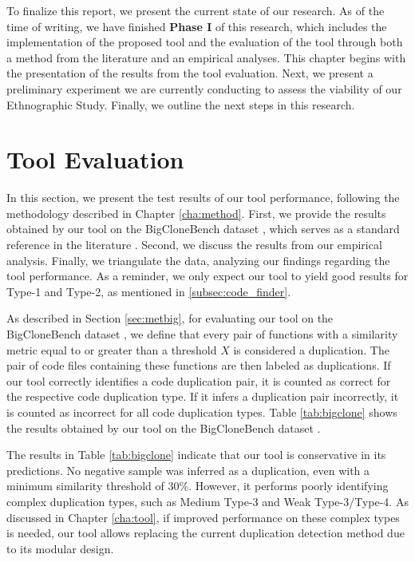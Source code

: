 \en 

To finalize this report, we present the current state of our research. As of the 
time of writing, we have finished \textbf{Phase I} of this research, 
which includes the implementation of 
the proposed tool and the evaluation of the tool through both a method from the 
literature and an empirical analyses. This chapter begins with the presentation of 
the results from the tool evaluation. Next, we present a preliminary experiment 
we are currently conducting to assess the viability of our Ethnographic Study. 
Finally, we outline the next steps in this research.

\section{Tool Evaluation}
\label{sec:eval}

In this section, we present the test results of our tool performance, following the 
methodology described in Chapter \ref{cha:method}. First, we provide the results 
obtained by our tool on the BigCloneBench dataset \citep{bigclonebench}, which 
serves as a standard reference in the literature \citep{litreview}. Second, we 
discuss the results from our empirical analysis. Finally, we triangulate the data, 
analyzing our findings regarding the tool performance. 
As a reminder, we only expect our tool to yield good results for Type-1 and Type-2,
as mentioned in \ref{subsec:code_finder}.



As described in Section \ref{sec:metbig}, for evaluating our tool on the BigCloneBench dataset \citep{bigclonebench}, we define that every pair of functions with a similarity metric equal to or greater than a threshold \( X \) is considered a duplication. The pair of code files containing these functions are then labeled as duplications. If our tool correctly identifies a code duplication pair, it is counted as correct for the respective code duplication type. If it infers a duplication pair incorrectly, it is counted as incorrect for all code duplication types. Table \ref{tab:bigclone} shows the results obtained by our tool on the BigCloneBench dataset \citep{bigclonebench}.

The results in Table \ref{tab:bigclone} indicate that our tool is conservative in its predictions. No negative sample was inferred as a duplication, even with a minimum similarity threshold of 30\%. However, it performs poorly identifying complex duplication types, such as Medium Type-3 and Weak Type-3/Type-4. As discussed in Chapter \ref{cha:tool}, if improved performance on these complex types is needed, our tool allows replacing the current duplication detection method due to its modular design.

